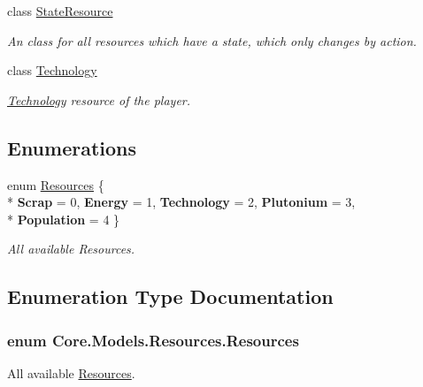 \begin{DoxyCompactItemize}
class \hyperlink{classCore_1_1Models_1_1Resources_1_1StateResource}{State\+Resource}
\begin{DoxyCompactList}\small\item\em An class for all resources which have a state, which only changes by action. \end{DoxyCompactList}\item 
class \hyperlink{classCore_1_1Models_1_1Resources_1_1Technology}{Technology}
\begin{DoxyCompactList}\small\item\em \hyperlink{classCore_1_1Models_1_1Resources_1_1Technology}{Technology} resource of the player. \end{DoxyCompactList}\end{DoxyCompactItemize}
\subsection*{Enumerations}
\begin{DoxyCompactItemize}
\item 
enum \hyperlink{namespaceCore_1_1Models_1_1Resources_a486f396c6c37f031cd950fef06ebfd7a}{Resources} \{ \\*
{\bfseries Scrap} = 0, 
{\bfseries Energy} = 1, 
{\bfseries Technology} = 2, 
{\bfseries Plutonium} = 3, 
\\*
{\bfseries Population} = 4
 \}\begin{DoxyCompactList}\small\item\em All available Resources. \end{DoxyCompactList}
\end{DoxyCompactItemize}


\subsection{Enumeration Type Documentation}
\hypertarget{namespaceCore_1_1Models_1_1Resources_a486f396c6c37f031cd950fef06ebfd7a}{}
\subsubsection[{Resources}]{\setlength{\rightskip}{0pt plus 5cm}enum {\bf Core.\+Models.\+Resources.\+Resources}\hspace{0.3cm}{\ttfamily [strong]}}\label{namespaceCore_1_1Models_1_1Resources_a486f396c6c37f031cd950fef06ebfd7a}


All available \hyperlink{namespaceCore_1_1Models_1_1Resources}{Resources}. 

